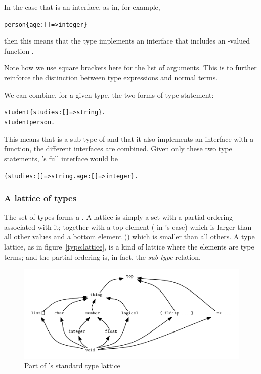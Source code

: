 In the case that  is an interface, as in, for example,
\begin{alltt}
person \impl \{ age:[]=>integer\}
\end{alltt}
then this means that the  type implements an interface that includes an -valued function .
\begin{aside}
Note how we use square brackets here for the list of arguments. This is to further reinforce the distinction between type expressions and normal terms.
\end{aside}

We can combine, for a given type, the two forms of type statement:
\begin{alltt}
student \impl \{ studies:[]=>string\}.
student \impl person.
\end{alltt}
This means that  is a sub-type of  and that it also implements an interface with a  function, the different interfaces are combined. Given only these two type statements, 's full interface would be
\begin{alltt}
\{ studies:[]=>string. age:[]=>integer\}.
\end{alltt}

\subsubsection{A lattice of types}
The set of types forms a . A lattice is simply a set with a partial ordering associated with it; together with a top element ( in \go's case) which is larger than all other values and a bottom element () which is smaller than all others. A type lattice, as in figure~\vref{type:lattice}, is a kind of lattice where the elements are type terms; and the partial ordering is, in fact, the \emph{sub-type} relation. 

\begin{figure}
\centerline{\includegraphics[width=\textwidth]{lattice}}
\caption{\label{type:lattice}Part of \go's standard type lattice}
\end{figure}

